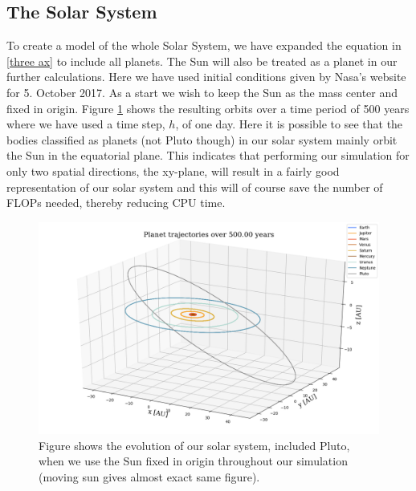 \documentclass[12pt]{article}
\numberwithin{figure}{section}
\numberwithin{table}{section}
\begin{document}
\subsection{The Solar System}


\noindent To create a model of the whole Solar System, we have expanded the equation in \eqref{three ax} to include all planets. The Sun will also be treated as a planet in our further calculations. Here we have used initial conditions given by Nasa's website for 5. October 2017. As a start we wish to keep the Sun as the mass center and fixed in origin. Figure \ref{fig:solarsys fixed sun} shows the resulting orbits over a time period of 500 years where we have used a time step, $h$, of one day. Here it is possible to see that the bodies classified as planets (not Pluto though) in our solar system mainly orbit the Sun in the equatorial plane. This indicates that performing our simulation for only two spatial directions, the xy-plane, will result in a fairly good representation of our solar system and this will of course save the number of FLOPs needed, thereby reducing CPU time.  \\


\begin{figure}[ht]
 \centerline{\includegraphics[scale = 0.55]{solar_system_fixedsun_nasa_3D.png}}
 \caption{Figure shows the evolution of our solar system, included Pluto, when we use the Sun fixed in origin throughout our simulation (moving sun gives almost exact same figure).}
 \label{fig:solarsys fixed sun}
\end{figure}
\end{document}
